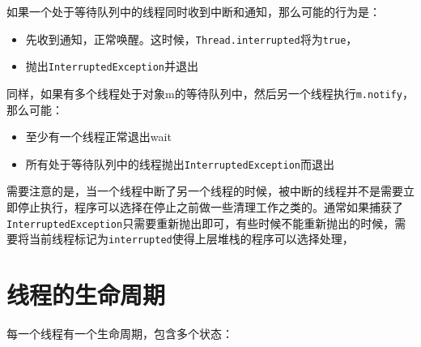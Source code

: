 \documentclass[12pt]{article}
\begin{document}
如果一个处于等待队列中的线程同时收到中断和通知，那么可能的行为是：

\begin{itemize}
\tightlist
\item
  先收到通知，正常唤醒。这时候，\texttt{Thread.interrupted}将为\texttt{true}，
\item
  抛出\texttt{InterruptedException}并退出
\end{itemize}

同样，如果有多个线程处于对象m的等待队列中，然后另一个线程执行\texttt{m.notify}，那么可能：

\begin{itemize}
\tightlist
\item
  至少有一个线程正常退出wait
\item
  所有处于等待队列中的线程抛出\texttt{InterruptedException}而退出
\end{itemize}

需要注意的是，当一个线程中断了另一个线程的时候，被中断的线程并不是需要立即停止执行，程序可以选择在停止之前做一些清理工作之类的。通常如果捕获了\texttt{InterruptedException}只需要重新抛出即可，有些时候不能重新抛出的时候，需要将当前线程标记为\texttt{interrupted}使得上层堆栈的程序可以选择处理，

\begin{Shaded}
\begin{Highlighting}[]
 \OperatorTok{\{}
     \OperatorTok{(}\OperatorTok{)} \OperatorTok{\{}
\OperatorTok{=}\OperatorTok{(}\OperatorTok{,} \OperatorTok{);}
\OperatorTok{();}
    \OperatorTok{\}}
\OperatorTok{\}} \OperatorTok{(}\OperatorTok{)} \OperatorTok{\{} 
    \OperatorTok{();}
\OperatorTok{\}}
\end{Highlighting}
\end{Shaded}

\section{线程的生命周期}\label{ux7ebfux7a0bux7684ux751fux547dux5468ux671f}

每一个线程有一个生命周期，包含多个状态：
\end{document}
